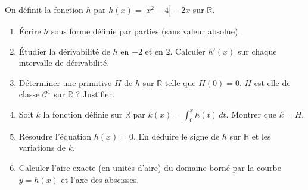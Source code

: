 \documentclass[11pt]{article}
\begin{document}
\begin{exercice}
On définit la fonction $h$ par $h(x) = |x^2 - 4| - 2x$ sur $\mathbb{R}$.
\begin{enumerate}
    \item Écrire $h$ sous forme définie par parties (sans valeur absolue).
    \item Étudier la dérivabilité de $h$ en $-2$ et en $2$. Calculer $h'(x)$ sur chaque intervalle de dérivabilité.
    \item Déterminer une primitive $H$ de $h$ sur $\mathbb{R}$ telle que $H(0) = 0$. $H$ est-elle de classe $\mathcal{C}^1$ sur $\mathbb{R}$ ? Justifier.
    \item Soit $k$ la fonction définie sur $\mathbb{R}$ par $k(x) = \displaystyle\int_0^x h(t)\,dt$. Montrer que $k = H$.
    \item Résoudre l'équation $h(x) = 0$. En déduire le signe de $h$ sur $\mathbb{R}$ et les variations de $k$.
    \item Calculer l'aire exacte (en unités d'aire) du domaine borné par la courbe $y = h(x)$ et l'axe des abscisses.
\end{enumerate}
\end{exercice}
\end{document}
